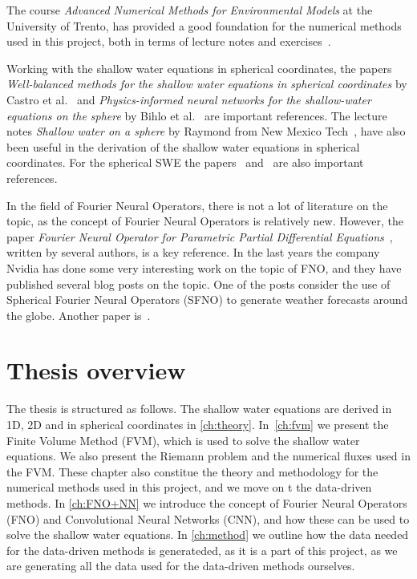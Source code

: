 The course \textit{Advanced Numerical Methods for Environmental Models} at the University of Trento, has provided a good foundation for the numerical methods used in this project, both in terms of lecture notes and exercises~\cite{trento_course}.

Working with the shallow water equations in spherical coordinates, the papers \textit{Well-balanced methods for the shallow water equations in spherical coordinates} by Castro et al.~\cite{Castro2017} and \textit{Physics-informed neural networks for the shallow-water equations on the sphere} by Bihlo et al.~\cite{Bihlo2022} are important references.
The lecture notes \textit{Shallow water on a sphere} by Raymond from New Mexico Tech~\cite{Raymond}, have also been useful in the derivation of the shallow water equations in spherical coordinates.
For the spherical SWE the papers~\cite{Gavete_2009} and~\cite{Galewsky_2004} are also important references.


In the field of Fourier Neural Operators, there is not a lot of literature on the topic, as the concept of Fourier Neural Operators is relatively new.
However, the paper \textit{Fourier Neural Operator for Parametric Partial Differential Equations}~\cite{FNO_2021}, written by several authors, is a key reference.
In the last years the company Nvidia has done some very interesting work on the topic of FNO, and they have published several blog posts on the topic.
One of the posts consider the use of Spherical Fourier Neural Operators (SFNO) to generate weather forecasts around the globe\cite{Nvidia2023}.
Another paper is~\cite{bonev2023-SFNO}.



\section{Thesis overview}
The thesis is structured as follows.
The shallow water equations are derived in 1D, 2D and in spherical coordinates in \autoref{ch:theory}.
In~\autoref{ch:fvm} we present the Finite Volume Method (FVM), which is used to solve the shallow water equations. 
We also present the Riemann problem and the numerical fluxes used in the FVM.
These chapter also constitue the theory and methodology for the numerical methods used in this project, and we move on t the data-driven methods.
In \autoref{ch:FNO+NN} we introduce the concept of Fourier Neural Operators (FNO) and Convolutional Neural Networks (CNN), and how these can be used to solve the shallow water equations.
In \autoref{ch:method} we outline how the data needed for the data-driven methods is generateded, as it is a part of this project, as we are generating all the data used for the data-driven methods ourselves.

